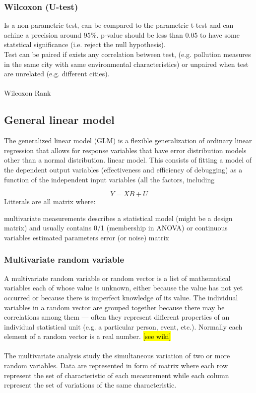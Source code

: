 	\subsubsection{Wilcoxon (U-test)}
	Is a non-parametric test, can be compared to the parametric t-test and can achine a precision around 95\%. p-value should be less than 0.05 to have some statstical significance (i.e. reject the null hypothesis).\\
	Test can be paired if exists any correlation between test, (e.g. pollution measures in the same city with same environmental characteristics) or unpaired when test are unrelated (e.g. different cities).
	\\\\
	Wilcoxon Rank

\subsection{General linear model}
The generalized linear model (GLM) is a flexible generalization of ordinary linear regression that allows for response variables that have error distribution models other than a normal distribution. linear model. This consists of fitting a model of the dependent output variables (effectiveness and efficiency of debugging) as a function of the independent input variables (all the factors, including

\begin{equation}
	Y = XB + U
\end{equation}
Litterals are all matrix where:
\begin{itemize}
	 multivariate measurements
	 describes a statistical model (might be a design matrix) and usually contains 0/1 (membership in ANOVA) or continuous variables
	 estimated parameters
	 error (or noise) matrix
\end{itemize}

\subsubsection{Multivariate random variable}
A multivariate random variable or random vector is a list of mathematical variables each of whose value is unknown, either because the value has not yet occurred or because there is imperfect knowledge of its value. The individual variables in a random vector are grouped together because there may be correlations among them — often they represent different properties of an individual statistical unit (e.g. a particular person, event, etc.). Normally each element of a random vector is a real number. \hl{[see wiki]}
\\\\
The multivariate analysis study the simultaneous variation of two or more random variables. Data are represented in form of matrix where each row represent the set of characteristic of each measurement while each column represent the set of variations of the same characteristic.

